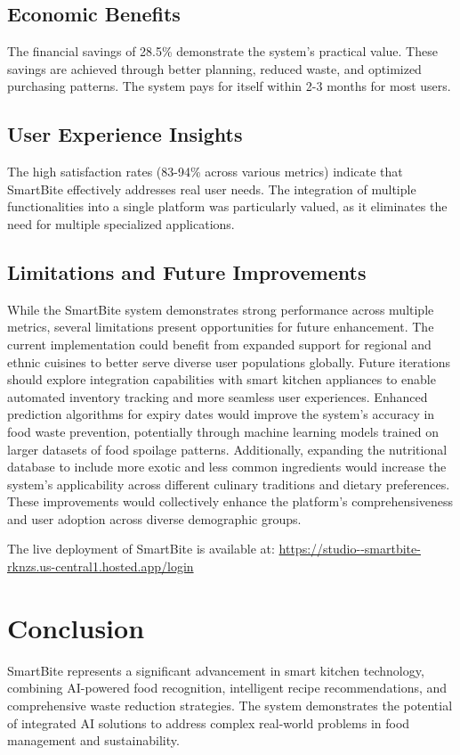 \documentclass[conference]{IEEEtran}
\begin{document}
\subsection{Economic Benefits}
The financial savings of 28.5\% demonstrate the system's practical value. These savings are achieved through better planning, reduced waste, and optimized purchasing patterns. The system pays for itself within 2-3 months for most users.

\subsection{User Experience Insights}
The high satisfaction rates (83-94\% across various metrics) indicate that SmartBite effectively addresses real user needs. The integration of multiple functionalities into a single platform was particularly valued, as it eliminates the need for multiple specialized applications.

\subsection{Limitations and Future Improvements}
While the SmartBite system demonstrates strong performance across multiple metrics, several limitations present opportunities for future enhancement. The current implementation could benefit from expanded support for regional and ethnic cuisines to better serve diverse user populations globally. Future iterations should explore integration capabilities with smart kitchen appliances to enable automated inventory tracking and more seamless user experiences. Enhanced prediction algorithms for expiry dates would improve the system's accuracy in food waste prevention, potentially through machine learning models trained on larger datasets of food spoilage patterns. Additionally, expanding the nutritional database to include more exotic and less common ingredients would increase the system's applicability across different culinary traditions and dietary preferences. These improvements would collectively enhance the platform's comprehensiveness and user adoption across diverse demographic groups.

The live deployment of SmartBite is available at: \url{https://studio--smartbite-rknzs.us-central1.hosted.app/login}

\section{Conclusion}
SmartBite represents a significant advancement in smart kitchen technology, combining AI-powered food recognition, intelligent recipe recommendations, and comprehensive waste reduction strategies. The system demonstrates the potential of integrated AI solutions to address complex real-world problems in food management and sustainability.
\end{document}
